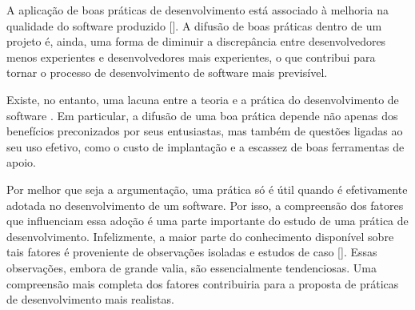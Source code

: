 \documentclass{article}
\begin{document}

A aplicação de boas práticas de desenvolvimento está associado à melhoria na
qualidade do software produzido []. A difusão de boas práticas dentro de um
projeto é, ainda, uma forma de diminuir a discrepância entre desenvolvedores
menos experientes e desenvolvedores mais experientes, o que contribui para
tornar o processo de desenvolvimento de software mais previsível.

Existe, no entanto, uma lacuna entre a teoria e a prática do desenvolvimento de
software \cite{glass1996}. Em particular, a difusão de uma boa prática depende
não apenas dos benefícios preconizados por seus entusiastas, mas também de
questões ligadas ao seu uso efetivo, como o custo de implantação e a escassez de
boas ferramentas de apoio. 

Por melhor que seja a argumentação, uma prática só é útil quando é efetivamente
adotada no desenvolvimento de um software. Por isso, a compreensão dos fatores
que influenciam essa adoção é uma parte importante do estudo de uma prática de
desenvolvimento. Infelizmente, a maior parte do conhecimento disponível sobre
tais fatores é proveniente de observações isoladas e estudos de caso []. Essas
observações, embora de grande valia, são essencialmente tendenciosas. Uma
compreensão mais completa dos fatores contribuiria para a proposta de práticas
de desenvolvimento mais realistas. 

%

\end{document}
